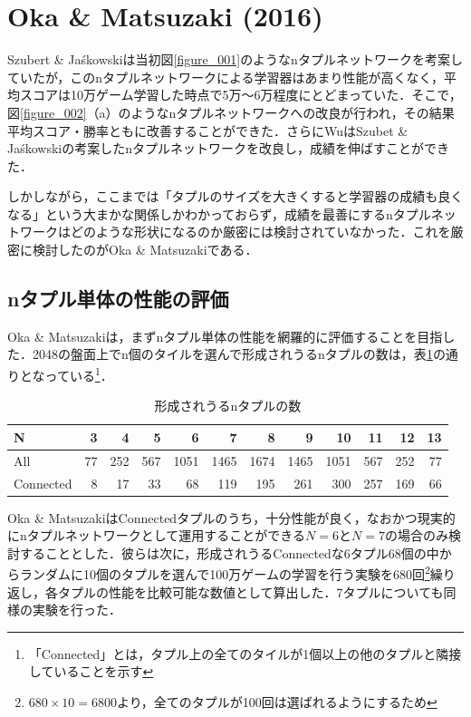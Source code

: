 \documentclass{suribt}
\begin{document}
\section{Oka \& Matsuzaki (2016)}
Szubert \& Ja\'{s}kowskiは当初図\ref{figure_001}のようなnタプルネットワークを考案していたが，このnタプルネットワークによる学習器はあまり性能が高くなく，平均スコアは10万ゲーム学習した時点で5万〜6万程度にとどまっていた．そこで，図\ref{figure_002}（a）のようなnタプルネットワークへの改良が行われ，その結果平均スコア・勝率ともに改善することができた．さらにWuはSzubet \& Ja\'{s}kowskiの考案したnタプルネットワークを改良し，成績を伸ばすことができた．

しかしながら，ここまでは「タプルのサイズを大きくすると学習器の成績も良くなる」という大まかな関係しかわかっておらず，成績を最善にするnタプルネットワークはどのような形状になるのか厳密には検討されていなかった．これを厳密に検討したのがOka \& Matsuzakiである．

\subsection{nタプル単体の性能の評価}
Oka \& Matsuzakiは，まずnタプル単体の性能を網羅的に評価することを目指した．2048の盤面上でn個のタイルを選んで形成されうるnタプルの数は，表\ref{tab:ntuplesNumber}の通りとなっている\footnote{「Connected」とは，タプル上の全てのタイルが1個以上の他のタプルと隣接していることを示す}．

\begin{table}[t]
	\begin{center}
		\caption{形成されうるnタプルの数}
		\begin{tabular}{l|r|r|r|r|r|r|r|r|r|r|r} \hline
		N & 3 & 4 & 5 & 6 & 7 & 8 & 9 & 10 & 11 & 12 & 13 \\ \hline \hline
		All & 77 & 252 & 567 & 1051 & 1465 & 1674 & 1465 & 1051 & 567 & 252 & 77 \\ \hline
		Connected & 8 & 17 & 33 & 68 & 119 & 195 & 261 & 300 & 257 & 169 & 66 \\ \hline
		\end{tabular}
		\label{tab:ntuplesNumber}
	\end{center}
\end{table}

Oka \& MatsuzakiはConnectedタプルのうち，十分性能が良く，なおかつ現実的にnタプルネットワークとして運用することができる$N=6$と$N=7$の場合のみ検討することとした．彼らは次に，形成されうるConnectedな6タプル68個の中からランダムに10個のタプルを選んで100万ゲームの学習を行う実験を680回\footnote{$680 \times 10 = 6800$より，全てのタプルが100回は選ばれるようにするため}繰り返し，各タプルの性能を比較可能な数値として算出した．7タプルについても同様の実験を行った．
\end{document}
